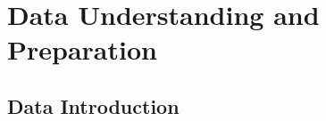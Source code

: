\chapter{Data Understanding and Preparation}
\label{ch:capitolo1}













\section{Data Introduction}\label{sec:data_intro}



